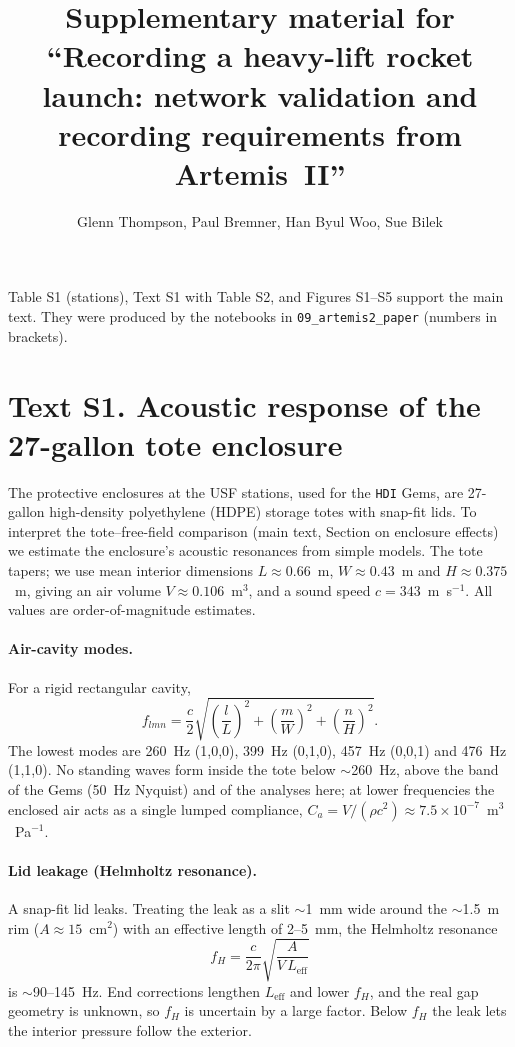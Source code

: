 \documentclass[11pt]{article}
\title{Supplementary material for\\ ``Recording a heavy-lift rocket launch: network validation and recording requirements from Artemis~II''}
\author{Glenn Thompson, Paul Bremner, Han Byul Woo, Sue Bilek}
\date{}
\begin{document}
\maketitle

Table S1 (stations), Text S1 with Table S2, and Figures S1--S5 support the main text. They were produced by the notebooks in
\texttt{09\_artemis2\_paper} (numbers in brackets).


\section*{Text S1. Acoustic response of the 27-gallon tote enclosure}
\label{text:tote}

The protective enclosures at the USF stations, used for the \texttt{HDI} Gems, are 27-gallon
high-density polyethylene (HDPE) storage totes with snap-fit lids. To interpret the tote--free-field
comparison (main text, Section on enclosure effects) we estimate the enclosure's acoustic resonances
from simple models. The tote tapers; we use mean interior dimensions $L \approx 0.66$~m,
$W \approx 0.43$~m and $H \approx 0.375$~m, giving an air volume $V \approx 0.106$~m$^3$, and a sound
speed $c = 343$~m~s$^{-1}$. All values are order-of-magnitude estimates.

\paragraph{Air-cavity modes.} For a rigid rectangular cavity,
\begin{equation}
  f_{lmn} = \frac{c}{2}\sqrt{\left(\frac{l}{L}\right)^2 + \left(\frac{m}{W}\right)^2 + \left(\frac{n}{H}\right)^2}.
\end{equation}
The lowest modes are 260~Hz (1,0,0), 399~Hz (0,1,0), 457~Hz (0,0,1) and 476~Hz (1,1,0). No standing
waves form inside the tote below $\sim$260~Hz, above the band of the Gems (50~Hz Nyquist) and of
the analyses here; at lower frequencies the enclosed air acts as a single lumped compliance,
$C_a = V/(\rho c^2) \approx 7.5\times10^{-7}$~m$^3$~Pa$^{-1}$.

\paragraph{Lid leakage (Helmholtz resonance).} A snap-fit lid leaks. Treating the leak as a slit
$\sim$1~mm wide around the $\sim$1.5~m rim ($A \approx 15$~cm$^2$) with an effective length of
2--5~mm, the Helmholtz resonance
\begin{equation}
  f_H = \frac{c}{2\pi}\sqrt{\frac{A}{V\,L_\text{eff}}}
\end{equation}
is $\sim$90--145~Hz. End corrections lengthen $L_\text{eff}$ and lower $f_H$, and the real gap
geometry is unknown, so $f_H$ is uncertain by a large factor. Below $f_H$ the leak lets the interior
pressure follow the exterior.
\end{document}

